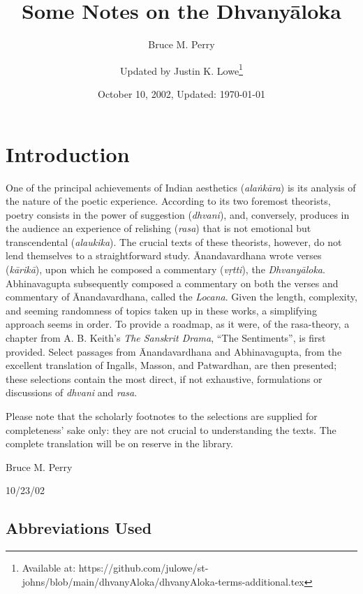 \documentclass[10pt]{article}
\title{Some Notes on the Dhvanyāloka}
\author{Bruce M. Perry \and Updated by Justin K. Lowe\footnote{Available at: https://github.com/julowe/st-johns/blob/main/dhvanyAloka/dhvanyAloka-terms-additional.tex} }
\date{October 10, 2002, Updated: \today}
\begin{document}
\maketitle

\vspace{-8mm}
\section{Introduction}

 {\fontsize{10pt}{14pt}\selectfont
  One of the principal achievements of Indian aesthetics (\textit{alaṅkāra}) is its analysis of the nature of the poetic experience.
  According to its two foremost theorists, poetry consists in the power of suggestion (\textit{dhvani}), and, conversely, produces in the audience an experience of relishing (\textit{rasa}) that is not emotional but transcendental (\textit{alaukika}).
  The crucial texts of these theorists, however, do not lend themselves to a straightforward study.
  Ānandavardhana wrote verses (\textit{kārikā}), upon which he composed a commentary (\textit{vṛtti}), the \textit{Dhvanyāloka}.
  Abhinavagupta subsequently composed a commentary on both the verses and commentary of Ānandavardhana, called the \textit{Locana}.
  Given the length, complexity, and seeming randomness of topics taken up in these works, a simplifying approach seems in order.
  To provide a roadmap, as it were, of the rasa-theory, a chapter from A. B. Keith's \textit{The Sanskrit Drama}, ``The Sentiments'', is first provided.
  Select passages from Ānandavardhana and Abhinavagupta, from the excellent translation of Ingalls, Masson, and Patwardhan, are then presented; these selections contain the most direct, if not exhaustive, formulations or discussions of \textit{dhvani} and \textit{rasa}.

  Please note that the scholarly footnotes to the selections are supplied for completeness' sake only: they are not crucial to understanding the texts.
  The complete translation will be on reserve in the library.


  Bruce M. Perry

  10/23/02
 }





\subsection{Abbreviations Used}
\end{document}

